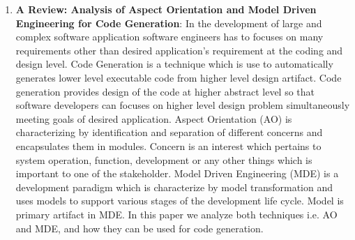 \begin{englishtext}
\begin{enumerate}
    \item \textbf{A Review: Analysis of Aspect Orientation and Model Driven Engineering
    for Code Generation}: In the development of large and complex software
    application software engineers has to focuses on many requirements other
    than desired application’s requirement at the coding and design level. Code
    Generation is a technique which is use to automatically generates lower
    level executable code from higher level design artifact. Code generation
    provides design of the code at higher abstract level so that software
    developers can focuses on higher level design problem simultaneously meeting
    goals of desired application. Aspect Orientation (AO) is characterizing by
    identification and separation of different concerns and encapsulates them in
    modules. Concern is an interest which pertains to system operation,
    function, development or any other things which is important to one of the
    stakeholder. Model Driven Engineering (MDE) is a development paradigm which
    is characterize by model transformation and uses models to support various
    stages of the development life cycle. Model is primary artifact in MDE. In
    this paper we analyze both techniques i.e. AO and MDE, and how they can be
    used for code generation. \cite{aspectOrientationReview}

\end{enumerate}
\end{englishtext}


